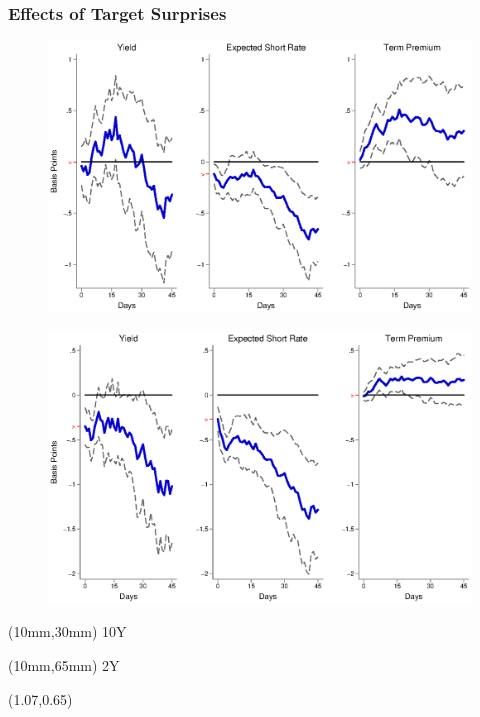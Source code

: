 \documentclass[12pt, aspectratio=169, xcolor=dvipsnames]{beamer}
\begin{document}
\begin{frame}[label=TargetUS]
\frametitle{Effects of Target Surprises}
\begin{figure}[!htbp]
\begin{center} %
\includegraphics[trim={0cm 0cm 0cm 0cm},clip,height=0.45\textheight,width=0.85\linewidth]{../Figures/LPs/LagDep-FX/Target/US/DCMP/TargetUSDnomyptp120m.eps}
\par\end{center}
\end{figure}
\vspace{-0.5cm}
\begin{figure}[!htbp]
\begin{center} %
\includegraphics[trim={0cm 0cm 0cm 0.76cm},clip,height=0.45\textheight,width=0.85\linewidth]{../Figures/LPs/LagDep-FX/Target/US/DCMP/TargetUSDnomyptp24m.eps}
\par\end{center}
\end{figure}
\begin{textblock*}{8mm}(10mm,30mm)
\small 10Y
\end{textblock*}
\begin{textblock*}{8mm}(10mm,65mm)
\small 2Y
\end{textblock*}
\begin{textblock*}{5cm}(1.07\textwidth,0.65\textheight)
\hyperlink{TargetEM}{}
\end{textblock*}
\end{frame}
\end{document}
